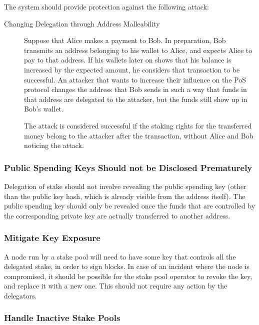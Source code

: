 \documentclass[11pt,a4paper]{article}
\begin{document}
The system should provide protection against the following attack:

\begin{description}
\item[Changing Delegation through Address Malleability]
Suppose that Alice makes a payment to Bob. In preparation, Bob transmits
an address belonging to his wallet to Alice, and expects Alice to pay to
that address. If his wallets later on shows that his balance is
increased by the expected amount, he considers that transaction to be
successful. An attacker that wants to increase their influence on the
PoS protocol changes the address that Bob sends in such a way that funds
in that address are delegated to the attacker, but the funds still show
up in Bob's wallet.

The attack is considered successful if the staking rights for the
transferred money belong to the attacker after the transaction, without
Alice and Bob noticing the attack.
\end{description}

\subsubsection{Public Spending Keys Should not be Disclosed Prematurely}
\label{public-spending-keys-should-not-be-disclosed-prematurely}

Delegation of stake should not involve revealing the public spending key (other
than the public key hash, which is already visible from the address itself). The
public spending key should only be revealed once the funds that are controlled
by the corresponding private key are actually transferred to another address.

\subsubsection{Mitigate Key Exposure}
\label{mitigate-key-exposure}

A node run by a stake pool will need to have some key that controls all
the delegated stake, in order to sign blocks. In case of an incident
where the node is compromised, it should be possible for the stake pool
operator to revoke the key, and replace it with a new one. This should
not require any action by the delegators.

\subsubsection{Handle Inactive Stake Pools}
\label{handle-inactive-stake-pools}
\end{document}
